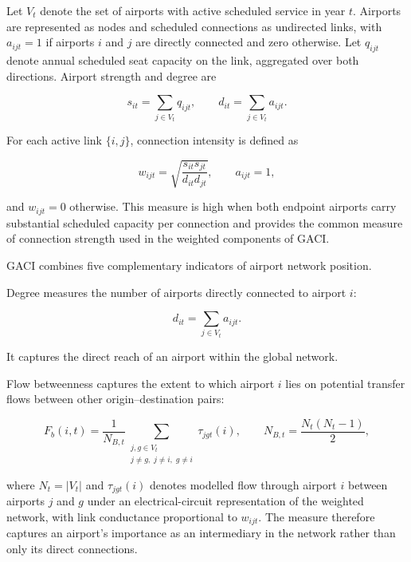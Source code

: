 \documentclass[12pt]{extarticle}
\begin{document}
Let $V_t$ denote the set of airports with active scheduled service in year $t$. Airports are represented as nodes and scheduled connections as undirected links, with $a_{ijt}=1$ if airports $i$ and $j$ are directly connected and zero otherwise. Let $q_{ijt}$ denote annual scheduled seat capacity on the link, aggregated over both directions. Airport strength and degree are

\begin{equation}
s_{it}
=
\sum_{j\in V_t} q_{ijt},
\qquad
d_{it}
=
\sum_{j\in V_t} a_{ijt}.
\label{eq:nature_9}
\end{equation}

For each active link $\{i,j\}$, connection intensity is defined as

\begin{equation}
w_{ijt}
=
\sqrt{
\frac{s_{it}s_{jt}}
{d_{it}d_{jt}}
},
\qquad
a_{ijt}=1,
\label{eq:nature_10}
\end{equation}

and $w_{ijt}=0$ otherwise. This measure is high when both endpoint airports carry substantial scheduled capacity per connection and provides the common measure of connection strength used in the weighted components of GACI.

GACI combines five complementary indicators of airport network position.

Degree measures the number of airports directly connected to airport $i$:

\begin{equation}
d_{it}
=
\sum_{j\in V_t} a_{ijt}.
\label{eq:nature_11}
\end{equation}

It captures the direct reach of an airport within the global network.

Flow betweenness captures the extent to which airport $i$ lies on potential transfer flows between other origin--destination pairs:

\begin{equation}
F_b(i,t)
=
\frac{1}{N_{B,t}}
\sum_{\substack{j,g\in V_t\\
j\neq g,\; j\neq i,\; g\neq i}}
\tau_{jgt}(i),
\qquad
N_{B,t}
=
\frac{N_t(N_t-1)}{2},
\label{eq:nature_12}
\end{equation}

where $N_t=|V_t|$ and $\tau_{jgt}(i)$ denotes modelled flow through airport $i$ between airports $j$ and $g$ under an electrical-circuit representation of the weighted network, with link conductance proportional to $w_{ijt}$. The measure therefore captures an airport's importance as an intermediary in the network rather than only its direct connections.
\end{document}
